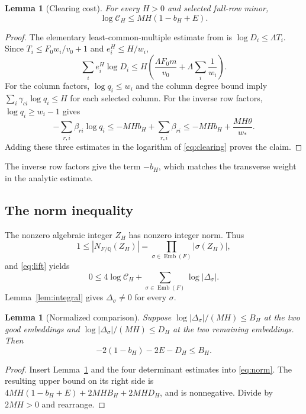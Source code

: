 \documentclass[11pt]{article}
\newtheorem{lemma}[theorem]{Lemma}
\theoremstyle{definition}
\theoremstyle{remark}
\theoremstyle{plain}
\newcommand{\Q}{\mathbb Q}
\newcommand{\Emb}{\operatorname{Emb}}
\begin{document}
\begin{lemma}[Clearing cost]\label{lem:clearingcost}
For every \(H>0\) and selected full-row minor,
\begin{equation}\label{eq:clearingcost}
 \log\mathscr C_H\le MH(1-b_H+E).
\end{equation}
\end{lemma}
\begin{proof}
The elementary least-common-multiple estimate from \cite{openai} is
\(\log D_i\le\Lambda T_i\). Since
\(T_i\le F_0w_i/v_0+1\) and \(e_i^H\le H/w_i\),
\[
 \sum_i e_i^H\log D_i
 \le H\left(\frac{\Lambda F_0m}{v_0}
                         +\Lambda\sum_i\frac1{w_i}\right).
\]
For the column factors, \(\log q_i\le w_i\) and the column degree
bound imply
\(\sum_i\gamma_{ci}\log q_i\le H\) for each selected column.
For the inverse row factors, \(\log q_i\ge w_i-1\) gives
\[
 -\sum_{r,i}\beta_{ri}\log q_i
 \le -MHb_H+\sum_{r,i}\beta_{ri}
 \le -MHb_H+\frac{MH\theta}{w_*}.
\]
Adding these three estimates in the logarithm of \eqref{eq:clearing}
proves the claim.
\end{proof}

The inverse row factors give the term \(-b_H\), which matches the
transverse weight in the analytic estimate.

\subsection{The norm inequality}
The nonzero algebraic integer \(Z_H\) has nonzero integer norm. Thus
\[
 1\le |N_{F/\Q}(Z_H)|=\prod_{\sigma\in\Emb(F)}|\sigma(Z_H)|,
\]
and \eqref{eq:lift} yields
\begin{equation}\label{eq:norm}
 0\le4\log\mathscr C_H+
              \sum_{\sigma\in\Emb(F)}\log|\Delta_\sigma|.
\end{equation}
Lemma~\ref{lem:integral} gives \(\Delta_\sigma\ne0\) for every
\(\sigma\).

\begin{lemma}[Normalized comparison]\label{lem:normcomparison}
Suppose \(\log|\Delta_\sigma|/(MH)\le B_H\) at the two good
embeddings and \(\log|\Delta_\sigma|/(MH)\le D_H\) at the two
remaining embeddings. Then
\begin{equation}\label{eq:normnormalized}
 -2(1-b_H)-2E-D_H\le B_H.
\end{equation}
\end{lemma}
\begin{proof}
Insert Lemma~\ref{lem:clearingcost} and the four determinant estimates
into \eqref{eq:norm}. The resulting upper bound on its right side is
\(4MH(1-b_H+E)+2MHB_H+2MHD_H\), and is nonnegative. Divide by
\(2MH>0\) and rearrange.
\end{proof}
\end{document}
